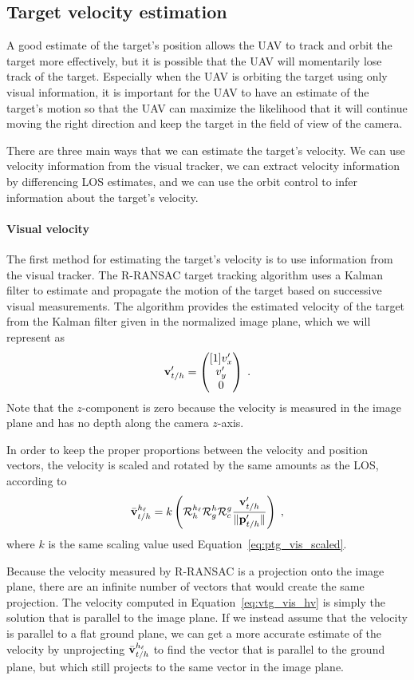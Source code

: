 \subsection{Target velocity estimation}
A good estimate of the target's position allows the UAV to track and orbit the target more effectively, but it is possible that the UAV will momentarily lose track of the target. Especially when the UAV is orbiting the target using only visual information, it is important for the UAV to have an estimate of the target's motion so that the UAV can maximize the likelihood that it will continue moving the right direction and keep the target in the field of view of the camera.

There are three main ways that we can estimate the target's velocity. We can use velocity information from the visual tracker, we can extract velocity information by differencing LOS estimates, and we can use the orbit control to infer information about the target's velocity.

\paragraph{Visual velocity}
The first method for estimating the target's velocity is to use information from the visual tracker. The R-RANSAC target tracking algorithm uses a Kalman filter to estimate and propagate the motion of the target based on successive visual measurements. The algorithm provides the estimated velocity of the target from the Kalman filter given in the normalized image plane, which we will represent as
\begin{equation}
    \vimgvec_{\TGwrtH} = \pmat{\vimgvar_x \\ \vimgvar_y \\ 0}\;.
\end{equation}
Note that the $z$-component is zero because the velocity is measured in the image plane and has no depth along the camera $z$-axis.

In order to keep the proper proportions between the velocity and position vectors, the velocity is scaled and rotated by the same amounts as the LOS, according to
\begin{equation} \label{eq:vtg_vis_hv}
    \veltghv[\bar] = k \left( \Rot{\hb}{\hv}\Rot{g}{\hb}\Rot{c}{g} \frac{\vimgvec_{\TGwrtH}}{\norm{\pimgvec_{\TGwrtH}}}\right)\;,
\end{equation}
where $k$ is the same scaling value used Equation~\eqref{eq:ptg_vis_scaled}.

Because the velocity measured by R-RANSAC is a projection onto the image plane, there are an infinite number of vectors that would create the same projection. The velocity computed in Equation~\eqref{eq:vtg_vis_hv} is simply the solution that is parallel to the image plane. If we instead assume that the velocity is parallel to a flat ground plane, we can get a more accurate estimate of the velocity by unprojecting $\veltghv[\bar]$ to find the vector that is parallel to the ground plane, but which still projects to the same vector in the image plane.


